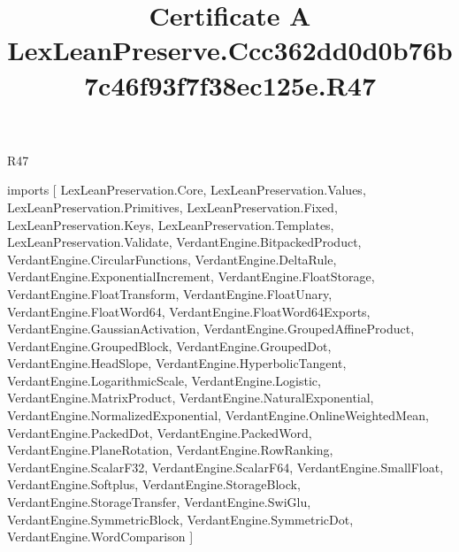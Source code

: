 \begin{lexlean}{R47}
\title{Certificate A LexLeanPreserve.Ccc362dd0d0b76b7c46f93f7f38ec125e.R47}
\begin{coremodule}
imports [
  LexLeanPreservation.Core,
  LexLeanPreservation.Values,
  LexLeanPreservation.Primitives,
  LexLeanPreservation.Fixed,
  LexLeanPreservation.Keys,
  LexLeanPreservation.Templates,
  LexLeanPreservation.Validate,
  VerdantEngine.BitpackedProduct,
  VerdantEngine.CircularFunctions,
  VerdantEngine.DeltaRule,
  VerdantEngine.ExponentialIncrement,
  VerdantEngine.FloatStorage,
  VerdantEngine.FloatTransform,
  VerdantEngine.FloatUnary,
  VerdantEngine.FloatWord64,
  VerdantEngine.FloatWord64Exports,
  VerdantEngine.GaussianActivation,
  VerdantEngine.GroupedAffineProduct,
  VerdantEngine.GroupedBlock,
  VerdantEngine.GroupedDot,
  VerdantEngine.HeadSlope,
  VerdantEngine.HyperbolicTangent,
  VerdantEngine.LogarithmicScale,
  VerdantEngine.Logistic,
  VerdantEngine.MatrixProduct,
  VerdantEngine.NaturalExponential,
  VerdantEngine.NormalizedExponential,
  VerdantEngine.OnlineWeightedMean,
  VerdantEngine.PackedDot,
  VerdantEngine.PackedWord,
  VerdantEngine.PlaneRotation,
  VerdantEngine.RowRanking,
  VerdantEngine.ScalarF32,
  VerdantEngine.ScalarF64,
  VerdantEngine.SmallFloat,
  VerdantEngine.Softplus,
  VerdantEngine.StorageBlock,
  VerdantEngine.StorageTransfer,
  VerdantEngine.SwiGlu,
  VerdantEngine.SymmetricBlock,
  VerdantEngine.SymmetricDot,
  VerdantEngine.WordComparison
]


\end{coremodule}
\end{lexlean}
